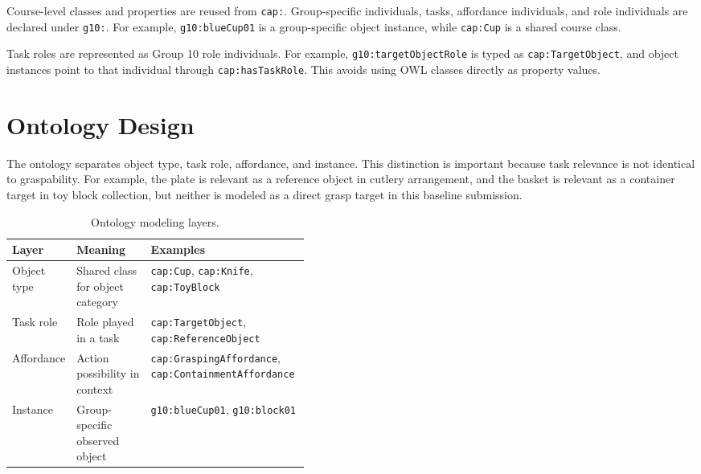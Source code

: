 \documentclass[a4paper, 11pt]{article}
\newcommand{\smallcode}[1]{\texttt{\footnotesize #1}}
\begin{document}
Course-level classes and properties are reused from \texttt{cap:}. Group-specific individuals, tasks, affordance individuals, and role individuals are declared under \texttt{g10:}. For example, \texttt{g10:blueCup01} is a group-specific object instance, while \texttt{cap:Cup} is a shared course class.

Task roles are represented as Group 10 role individuals. For example, \texttt{g10:targetObjectRole} is typed as \texttt{cap:TargetObject}, and object instances point to that individual through \texttt{cap:hasTaskRole}. This avoids using OWL classes directly as property values.

\section{Ontology Design}

The ontology separates object type, task role, affordance, and instance. This distinction is important because task relevance is not identical to graspability. For example, the plate is relevant as a reference object in cutlery arrangement, and the basket is relevant as a container target in toy block collection, but neither is modeled as a direct grasp target in this baseline submission.

\begin{table}[h]
\centering
\small
\setlength{\tabcolsep}{4pt}
\begin{tabularx}{\linewidth}{>{\raggedright\arraybackslash}p{0.18\linewidth} >{\raggedright\arraybackslash}p{0.25\linewidth} Y}
\toprule
\textbf{Layer} & \textbf{Meaning} & \textbf{Examples} \\
\midrule
Object type & Shared class for object category & \smallcode{cap:Cup}, \smallcode{cap:Knife}, \smallcode{cap:ToyBlock} \\
Task role & Role played in a task & \smallcode{cap:TargetObject}, \smallcode{cap:ReferenceObject} \\
Affordance & Action possibility in context & \smallcode{cap:GraspingAffordance}, \smallcode{cap:ContainmentAffordance} \\
Instance & Group-specific observed object & \smallcode{g10:blueCup01}, \smallcode{g10:block01} \\
\bottomrule
\end{tabularx}
\caption{Ontology modeling layers.}
\end{table}
\end{document}
